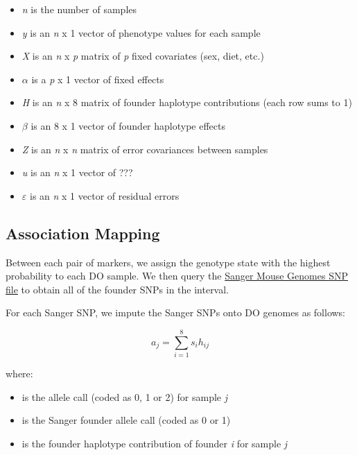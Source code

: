 \documentclass{article}
\begin{document}
\begin{itemize}
  \item{\textit{n} is the number of samples}
  \item{\textit{y} is an \textit{n} x 1 vector of phenotype values for each sample}
  \item{\textit{X} is an \textit{n} x \textit{p} matrix of \textit{p} fixed covariates (sex, diet, etc.) }
  \item{$\alpha$ is a \textit{p} x 1 vector of fixed effects }
  \item{\textit{H} is an \textit{n} x 8 matrix of founder haplotype contributions (each row sums to 1) }
  \item{$\beta$ is an 8 x 1 vector of founder haplotype effects }
  \item{\textit{Z} is an \textit{n} x \textit{n} matrix of error covariances between samples }
  \item{\textit{u} is an \textit{n} x 1 vector of ???}
  \item{$\varepsilon$ is an \textit{n} x 1 vector of residual errors}
\end{itemize}

\subsection{Association Mapping}

Between each pair of markers, we assign the genotype state with the highest probability to each DO sample. We then query the \href{ftp://ftp.jax.org/SNPtools/variants/}{Sanger Mouse Genomes SNP file} to obtain all of the founder SNPs in the interval.

For each Sanger SNP, we impute the Sanger SNPs onto DO genomes as follows:

\begin{equation}
a_{j}=\sum_{i=1}^{8}s_{i}h_{ij}
\end{equation}

where:

\begin{itemize}
  \item{ is the allele call (coded as 0, 1 or 2) for sample \textit{j} }
  \item{ is the Sanger founder allele call (coded as 0 or 1) }
  \item{ is the founder haplotype contribution of founder \textit{i} for sample \textit{j} }
\end{itemize}
\end{document}
